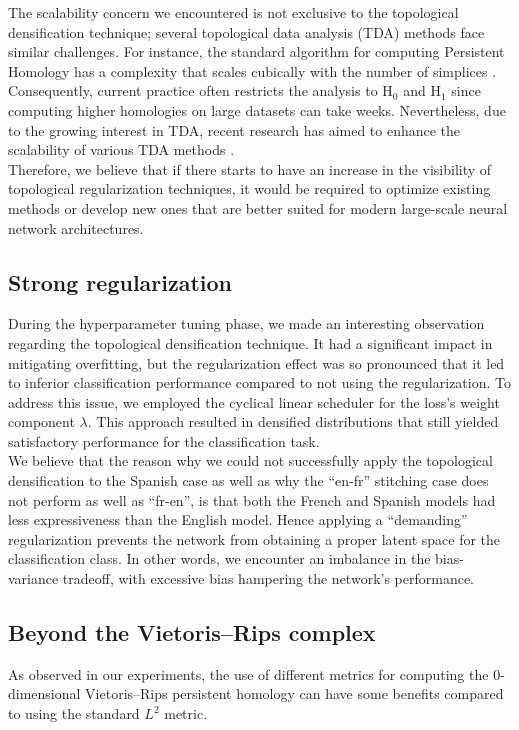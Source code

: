 \documentclass[../main.tex]{subfiles}
\begin{document}
The scalability concern we encountered is not exclusive to the topological densification technique; several topological data analysis (TDA) methods face similar challenges. For instance, the standard algorithm for computing Persistent Homology has a complexity that scales cubically with the number of simplices \cite{akcora_reduction_2022}. Consequently, current practice often restricts the analysis to $\text{H}_0$ and $\text{H}_1$ since computing higher homologies on large datasets can take weeks. Nevertheless, due to the growing interest in TDA, recent research has aimed to enhance the scalability of various TDA methods \cite{akcora_reduction_2022, polianskii_breaking_2022}.\\

Therefore, we believe that if there starts to have an increase in the visibility of topological regularization techniques, it would be required to optimize existing methods or develop new ones that are better suited for modern large-scale neural network architectures.

\subsection{Strong regularization}

During the hyperparameter tuning phase, we made an interesting observation regarding the topological densification technique. It had a significant impact in mitigating overfitting, but the regularization effect was so pronounced that it led to inferior classification performance compared to not using the regularization. To address this issue, we employed the cyclical linear scheduler for the loss's weight component $\lambda$. This approach resulted in densified distributions that still yielded satisfactory performance for the classification task.\\


We believe that the reason why we could not successfully apply the topological densification to the Spanish case as well as why the ``en-fr'' stitching case does not perform as well as ``fr-en'', is that both the French and Spanish models had less expressiveness than the English model. Hence applying a ``demanding'' regularization prevents the network from obtaining a proper latent space for the classification class. In other words, we encounter an imbalance in the bias-variance tradeoff, with excessive bias hampering the network's performance.


\subsection{Beyond the Vietoris–Rips complex}
\label{sec:witness_topo}
As observed in our experiments, the use of different metrics for computing the 0-dimensional Vietoris–Rips persistent homology can have some benefits compared to using the standard $L^2$ metric.
\end{document}
